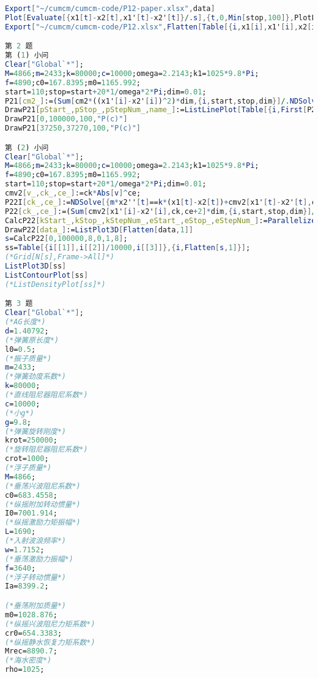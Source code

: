 \begin{lstlisting}[language=Mathematica,breaklines]
Export["~/cumcm/cumcm-code/P12-paper.xlsx",data]
Plot[Evaluate[{x1[t]-x2[t],x1'[t]-x2'[t]}/.s],{t,0,Min[stop,100]},PlotLegends->Placed[{"\[CapitalDelta]x","\[CapitalDelta]v"},{1,0.5}]]
Export["~/cumcm/cumcm-code/P12.xlsx",Flatten[Table[{i,x1[i],x1'[i],x2[i],x2'[i]}/.s,{i,Range[0,40/omega*2*Pi,0.2]}],1]]

第 2 题
第 (1) 小问
Clear["Global`*"];
M=4866;m=2433;k=80000;c=10000;omega=2.2143;k1=1025*9.8*Pi;
f=4890;c0=167.8395;m0=1165.992;
start=110;stop=start+20*1/omega*2*Pi;dim=0.01;
P21[cm2_]:=(Sum[cm2*((x1'[i]-x2'[i])^2)*dim,{i,start,stop,dim}]/.NDSolve[{m*x2''[t]==k*(x1[t]-x2[t])+cm2*(x1'[t]-x2'[t]),f*Cos[omega*t]==k*(x1[t]-x2[t])+cm2*(x1'[t]-x2'[t])+k1*x1[t]+c0*x1'[t]+m0*x1''[t]+M*x1''[t],x1[0]==x2[0]==x1'[0]==x2'[0]==0},{x1,x2},{t,start,stop}])/(stop-start)
DrawP21[pStart_,pStop_,pStepNum_,name_]:=ListLinePlot[Table[{i,First[P21[i]]},{i,Range[pStart,pStop,(pStop-pStart)/pStepNum]}],PlotLegends->Placed[name,{1,0.5}]]
DrawP21[0,100000,100,"P(c)"]
DrawP21[37250,37270,100,"P(c)"]

第 (2) 小问
Clear["Global`*"];
M=4866;m=2433;k=80000;c=10000;omega=2.2143;k1=1025*9.8*Pi;
f=4890;c0=167.8395;m0=1165.992;
start=110;stop=start+20*1/omega*2*Pi;dim=0.01;
cmv2[v_,ck_,ce_]:=ck*Abs[v]^ce;
P22I[ck_,ce_]:=NDSolve[{m*x2''[t]==k*(x1[t]-x2[t])+cmv2[x1'[t]-x2'[t],ck,ce]*(x1'[t]-x2'[t]),f*Cos[omega*t]==k*(x1[t]-x2[t])+cmv2[x1'[t]-x2'[t],ck,ce]*(x1'[t]-x2'[t])+k1*x1[t]+c0*x1'[t]+m0*x1''[t]+M*x1''[t],x1[0]==x2[0]==x1'[0]==x2'[0]==0},{x1,x2},{t,start,stop}]
P22[ck_,ce_]:=(Sum[cmv2[x1'[i]-x2'[i],ck,ce+2]*dim,{i,start,stop,dim}]/.P22I[ck,ce])/(stop-start)
CalcP22[kStart_,kStop_,kStepNum_,eStart_,eStop_,eStepNum_]:=Parallelize[Table[{pe,ppk,First[P22[ppk,pe]]},{ppk,Range[kStart,kStop,(kStop-kStart)/kStepNum]},{pe,Range[eStart,eStop,(eStop-eStart)/eStepNum]}]]
DrawP22[data_]:=ListPlot3D[Flatten[data,1]]
s=CalcP22[0,100000,8,0,1,8];
ss=Table[{i[[1]],i[[2]]/10000,i[[3]]},{i,Flatten[s,1]}];
(*Grid[N[s],Frame->All]*)
ListPlot3D[ss]
ListContourPlot[ss]
(*ListDensityPlot[ss]*)

第 3 题
Clear["Global`*"];
(*AG长度*)
d=1.40792;
(*弹簧原长度*)
l0=0.5;
(*振子质量*)
m=2433;
(*弹簧劲度系数*)
k=80000;
(*直线阻尼器阻尼系数*)
c=10000;
(*小g*)
g=9.8;
(*弹簧旋转刚度*)
krot=250000;
(*旋转阻尼器阻尼系数*)
crot=1000;
(*浮子质量*)
M=4866;
(*垂荡兴波阻尼系数*)
c0=683.4558;
(*纵摇附加转动惯量*)
I0=7001.914;
(*纵摇激励力矩振幅*)
L=1690;
(*入射波浪频率*)
w=1.7152;
(*垂荡激励力振幅*)
f=3640;
(*浮子转动惯量*)
Ia=8399.2;

(*垂荡附加质量*)
m0=1028.876;
(*纵摇兴波阻尼力矩系数*)
cr0=654.3383;
(*纵摇静水恢复力矩系数*)
Mrec=8890.7;
(*海水密度*)
rho=1025;


\end{lstlisting}
